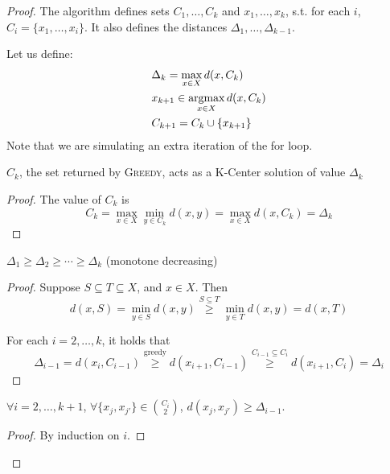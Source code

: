     \begin{proof}
        The algorithm defines sets $C_1, \dots, C_k$ and $x_1, \dots, x_k$, s.t. for each $i$, $C_i = \{ x_1, \dots, x_i \}$.
        It also defines the distances $\Delta_1, \dots, \Delta_{k-1}$.

        Let us define:
        \begin{equation*}
            \begin{split}
                &\Delta_k = \max_{x \in X} d(x, C_k)\\
                &x_{k+1} \in \operatorname*{argmax}_{x \in X} d(x, C_k)\\
                &C_{k+1} = C_k \cup \{ x_{k+1} \}
            \end{split}
        \end{equation*}
        Note that we are simulating an extra iteration of the for loop.

        \begin{claim}\label{claim:kcenter_1}
            $C_k$, the set returned by \textsc{Greedy}, acts as a K-Center solution of value $\Delta_k$
        \end{claim}
        \begin{proof}
            The value of $C_k$ is
            \[ C_k = \max_{x \in X} \min_{y \in C_k} d(x,y) = \max_{x \in X} d(x, C_k) = \Delta_k \]
        \end{proof}

        \begin{claim}\label{claim:kcenter_2}
            $\Delta_1 \geq \Delta_2 \geq \cdots \geq \Delta_k$ (monotone decreasing)
        \end{claim}
        \begin{proof}
            Suppose $S \subseteq T \subseteq X$, and $x \in X$.
            Then
            \[ d(x,S) = \min_{y \in S} d(x,y) \overset{S \subseteq T}{\geq} \min_{y \in T} d(x,y) = d(x,T) \]

            For each $i = 2, \dots, k$, it holds that
            \[ \Delta_{i-1} = d(x_i, C_{i-1}) \overset{\text{greedy}}{\geq} d(x_{i+1}, C_{i-1}) \overset{C_{i-1} \subseteq C_i}{\geq} d(x_{i+1}, C_i) = \Delta_i \]
        \end{proof}

        \begin{claim}\label{claim:kcenter_3}
            $\forall i = 2, \dots, k+1$, $\forall \{ x_j, x_{j'} \} \in \binom{C_i}{2}$, $d(x_j, x_{j'}) \geq \Delta_{i-1}$.
        \end{claim}
        \begin{proof}
            By induction on $i$.


\end{proof}
\end{proof}
